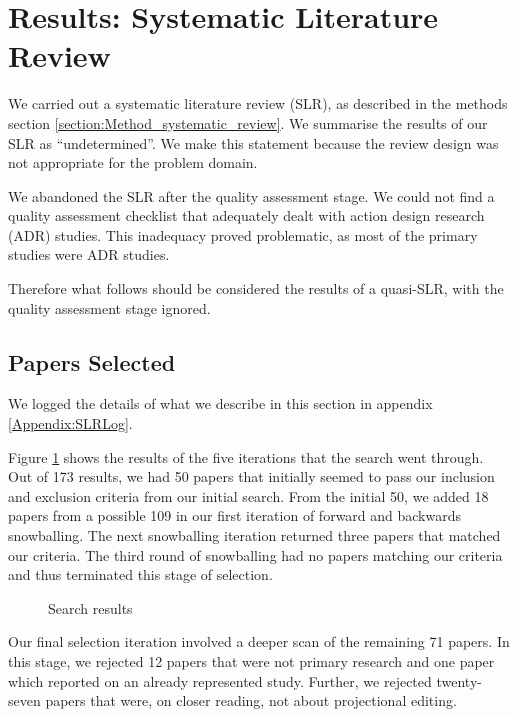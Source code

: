 \section{Results: Systematic Literature Review}
\label{section:Results_SLR}

We carried out a systematic literature review (SLR), as described in the methods section \ref{section:Method_systematic_review}.
We summarise the results of our SLR as ``undetermined''.
We make this statement because the review design was not appropriate for the problem domain.

We abandoned the SLR after the quality assessment stage.
We could not find a quality assessment checklist that adequately dealt with action design research (ADR) studies.
This inadequacy proved problematic, as most of the primary studies were ADR studies.

Therefore what follows should be considered the results of a quasi-SLR, with the quality assessment stage ignored.

\subsection{Papers Selected}
We logged the details of what we describe in this section in appendix \ref{Appendix:SLRLog}.

Figure \ref{fig:search_results} shows the results of the five iterations that the search went through.
Out of 173 results, we had 50 papers that initially seemed to pass our inclusion and exclusion criteria from our initial search.
From the initial 50, we added 18 papers from a possible 109 in our first iteration of forward and backwards snowballing.
The next snowballing iteration returned three papers that matched our criteria.
The third round of snowballing had no papers matching our criteria and thus terminated this stage of selection.

\begin{figure}[htbp]
    \centering
    \caption{Search results}
    \label{fig:search_results}
\end{figure}


Our final selection iteration involved a deeper scan of the remaining 71 papers.
In this stage, we rejected 12 papers that were not primary research and one paper which reported on an already represented study.
Further, we rejected twenty-seven papers that were, on closer reading, not about projectional editing.

